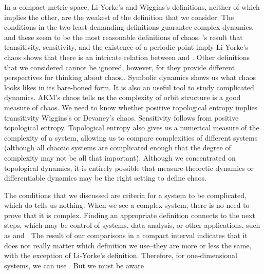 \documentclass[10pt,twoside,draft]{book}
\begin{document}
In a compact metric space, Li-Yorke's and Wiggins's definitions, neither of which implies the other, are the weakest of the definition that we consider.
The conditions in the two least demanding definitions guarantee complex dynamics, and these seem to be the most reasonable definitions of chaos.
\citet{mai}'s result that transitivity, sensitivity, and the existence of a periodic point imply Li-Yorke's chaos shows that there is an intricate relation between \liy and \wig.
Other definitions that we considered cannot be ignored, however, for they provide different perspectives for thinking about chaos..
Symbolic dynamics shows us what chaos looks likes in its bare-boned form.
It is also an useful tool to study complicated dynamics.
AKM's chaos tells us the complexity of orbit structure is a good measure of chaos.
We need to know whether positive topological entropy implies transitivity  Wiggins's or Devaney's chaos.
Sensitivity follows from positive topological entropy.
Topological entropy also gives us a numerical measure of the complexity of a system, allowing us to compare complexities of different systems (although all chaotic systems are complicated enough that the degree of complexity may not be all that important).
Although we concentrated on topological dynamics, it is entirely possible that measure-theoretic dynamics or differentiable dynamics may be the right setting to define chaos.


The conditions that we discussed are criteria for a system to be complicated, which do tells us nothing.
When we see a complex system, there is no need to prove that it is complex.
Finding an appropriate definition connects to the next steps, which may be control of systems, data analysis, or other applications, such as \citet{chaos-communication} and \citet{openproblems, chaos-frontiers}.
The result of our comparisons in a compact interval indicates that it does not really matter which definition we use--they are more or less the same, with the exception of Li-Yorke's definition.
Therefore, for one-dimensional systems, we can use .
But we must be aware



\end{document}
